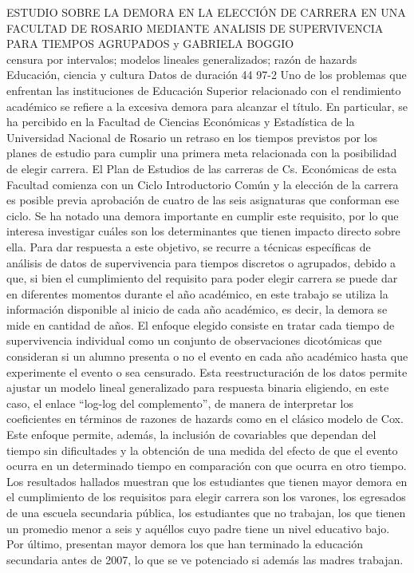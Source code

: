 \A
{ESTUDIO SOBRE LA DEMORA EN LA ELECCIÓN DE CARRERA EN UNA FACULTAD DE ROSARIO MEDIANTE ANALISIS DE SUPERVIVENCIA PARA TIEMPOS AGRUPADOS}
{ y GABRIELA BOGGIO}
{
\\}
{censura por intervalos; modelos lineales generalizados; razón de hazards} 
 {Educación, ciencia y cultura} 
 {Datos de duración} 
 {44} 
 {97-2}
{Uno de los problemas que enfrentan las instituciones de Educación Superior relacionado con el rendimiento académico se refiere a la excesiva demora para alcanzar el título. En particular, se ha percibido en la Facultad de Ciencias Económicas y Estadística de la Universidad Nacional de Rosario un retraso en los tiempos previstos por los planes de estudio para cumplir una primera meta relacionada con la posibilidad de elegir carrera. El Plan de Estudios de las carreras de Cs. Económicas de esta Facultad comienza con un Ciclo Introductorio Común y la elección de la carrera es posible previa aprobación de cuatro de las seis asignaturas que conforman ese ciclo. Se ha notado una demora importante en cumplir este requisito, por lo que interesa investigar cuáles son los determinantes que tienen impacto directo sobre ella. Para dar respuesta a este objetivo, se recurre a técnicas específicas de análisis de datos de supervivencia para tiempos discretos o agrupados, debido a que, si bien el cumplimiento del requisito para poder elegir carrera se puede dar en diferentes momentos durante el año académico, en este trabajo se utiliza la información disponible al inicio de cada año académico, es decir, la demora se mide en cantidad de años. El enfoque elegido consiste en tratar cada tiempo de supervivencia individual como un conjunto de observaciones dicotómicas que consideran si un alumno presenta o no el evento en cada año académico hasta que experimente el evento o sea censurado. Esta reestructuración de los datos permite ajustar un modelo lineal generalizado para respuesta binaria eligiendo, en este caso, el enlace “log-log del complemento”, de manera de interpretar los coeficientes en términos de razones de hazards como en el clásico modelo de Cox. Este enfoque permite, además, la inclusión de covariables que dependan del tiempo sin dificultades y la obtención de una medida del efecto de que el evento ocurra en un determinado tiempo en comparación con que ocurra en otro tiempo. Los resultados hallados muestran que los estudiantes que tienen mayor demora en el cumplimiento de los requisitos para elegir carrera son los varones, los egresados de una escuela secundaria pública, los estudiantes que no trabajan, los que tienen un promedio menor a seis y aquéllos cuyo padre tiene un nivel educativo bajo. Por último, presentan mayor demora los que han terminado la educación secundaria antes de 2007, lo que se ve potenciado si además las madres trabajan.}

